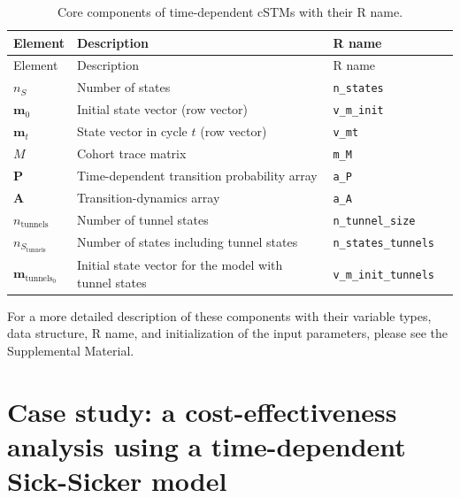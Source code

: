 \documentclass[
]{article}
\begin{document}
\begin{longtable}[]{@{}
  >{\raggedright\arraybackslash}p{}
  >{\raggedright\arraybackslash}p{}
  >{\centering\arraybackslash}p{}
  >{\raggedright\arraybackslash}p{}@{}}
\caption{\label{tab:Timedep-cSTM-components-table} Core components of time-dependent cSTMs with their R name.}\tabularnewline
\toprule
Element & Description & R name & \\
\midrule
\endfirsthead
\toprule
Element & Description & R name & \\
\midrule
\endhead
\(n_S\) & Number of states & \texttt{n\_states} & \\
\(\mathbf{m}_0\) & Initial state vector (row vector) & \texttt{v\_m\_init} & \\
\(\mathbf{m}_t\) & State vector in cycle \(t\) (row vector) & \texttt{v\_mt} & \\
\(M\) & Cohort trace matrix & \texttt{m\_M} & \\
\(\mathbf{P}\) & Time-dependent transition probability array & \texttt{a\_P} & \\
\(\mathbf{A}\) & Transition-dynamics array & \texttt{a\_A} & \\
\(n_{\text{tunnels}}\) & Number of tunnel states & \texttt{n\_tunnel\_size} & \\
\(n_{S_{\text{tunnels}}}\) & Number of states including tunnel states & \texttt{n\_states\_tunnels} & \\
\(\mathbf{m}_{\text{tunnels}_0}\) & Initial state vector for the model with tunnel states & \texttt{v\_m\_init\_tunnels} & \\
\bottomrule
\end{longtable}

For a more detailed description of these components with their variable types, data structure, R name, and initialization of the input parameters, please see the Supplemental Material.

\hypertarget{case-study-a-cost-effectiveness-analysis-using-a-time-dependent-sick-sicker-model}{%
\section{Case study: a cost-effectiveness analysis using a time-dependent Sick-Sicker model}\label{case-study-a-cost-effectiveness-analysis-using-a-time-dependent-sick-sicker-model}}
\end{document}
